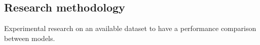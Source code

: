 \subsection{Research methodology}

Experimental research on an available dataset to have a performance comparison between models. 